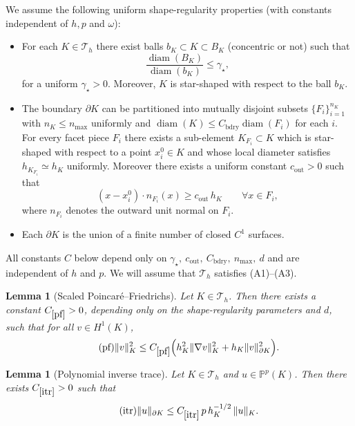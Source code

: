 \documentclass[11pt]{article}
\theoremstyle{definition}
\theoremstyle{plain}
\newtheorem{lemma}[theorem]{Lemma}
\newcommand{\const}[1]{C_{\eqref{#1}}}
\newcommand{\Th}{{\calT_h}}
\newcommand{\IP}{\mathbb{P}}
\newcommand{\calT}{\mathcal{T}}
\begin{document}
We assume the following uniform shape-regularity properties (with constants independent of $h,p$ and $\omega$):
\begin{itemize}
  \item[(A1)] For each $K\in\mathcal T_h$ there exist balls $b_K\subset K\subset B_K$ (concentric or not) such that
    \[
      \frac{\operatorname{diam}(B_K)}{\operatorname{diam}(b_K)}\leq \gamma_\star,
    \]
    for a uniform $\gamma_\star>0$. Moreover, $K$ is star-shaped with respect to the ball $b_K$.
  \item[(A2)]
    The boundary $\partial K$ can be partitioned into mutually disjoint subsets $\{F_i\}_{i=1}^{n_K}$
    with $n_K\leq n_{\max}$ uniformly and $\operatorname{diam}(K)\leq C_{\mathrm{bdry}}\operatorname{diam}(F_i)$ for each $i$.
    For every facet piece $F_i$ there exists a sub-element $K_{F_i}\subset K$ which is star-shaped
    with respect to a point $x_i^0\in K$ and whose local diameter satisfies $h_{K_{F_i}}\simeq h_K$ uniformly.
    Moreover there exists a uniform constant $c_{\mathrm{out}}>0$ such that
    \[
      (x-x_i^0)\cdot n_{F_i}(x)\ge c_{\mathrm{out}}\,h_K\qquad\forall x\in F_i,
    \]
    where $n_{F_i}$ denotes the outward unit normal on $F_i$.
  \item[(A3)] Each $\partial K$ is the union of a finite number of closed $C^1$ surfaces.
\end{itemize}

All constants $C$ below depend only on
$\gamma_\star,\ c_{\mathrm{out}},\ C_{\mathrm{bdry}},\ n_{\max},\ d$
and are independent of $h$ and $p$.
We will assume that $\Th$ satisfies \textup{(A1)}--\textup{(A3)}. 

\begin{lemma}[Scaled Poincar\'e--Friedrichs]\label{lem:pf}
Let $K\in\Th$. Then there exists a constant $\const{pf}>0$,
depending only on the shape-regularity parameters and $d$, such that for all $v\in H^1(K)$,
\begin{equation}\tag{pf}\label{pf}
\|v\|_{K}^2
\le \const{pf}\Big(h_K^2\|\nabla v\|_{K}^2 + h_K\|v\|_{\partial K}^2\Big).
\end{equation}
\end{lemma}

\begin{lemma}[Polynomial inverse trace]\label{lem:itr}
Let $K\in\Th$ and $u\in\IP^p(K)$. Then there exists $\const{itr}>0$ such that
\begin{equation}\tag{itr}\label{itr}
\|u\|_{\partial K} \leq \const{itr}\,p\,h_K^{-1/2}\,\|u\|_{K}.
\end{equation}
\end{lemma}
\end{document}
